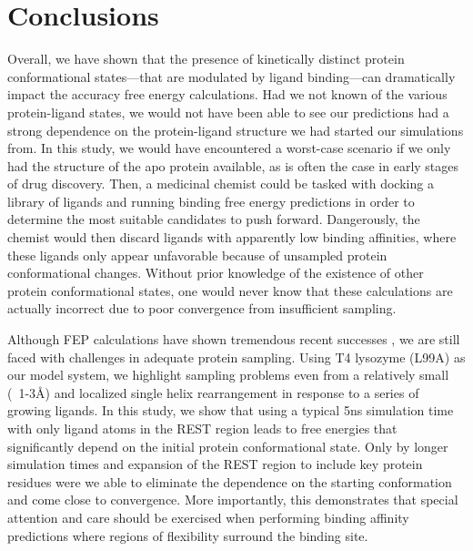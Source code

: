 \documentclass[journal=jctcce,manuscript=article]{achemso}
\begin{document}
\section{Conclusions}
Overall, we have shown that the presence of kinetically distinct protein conformational states---that are modulated by ligand binding---can dramatically impact the accuracy free energy calculations.
Had we not known of the various protein-ligand states, we would not have been able to see our predictions had a strong dependence on the protein-ligand structure we had started our simulations from.
In this study, we would have encountered a worst-case scenario if we only had the structure of the apo protein available, as is often the case in early stages of drug discovery.
Then, a medicinal chemist could be tasked with docking a library of ligands and running binding free energy predictions in order to determine the most suitable candidates to push forward.
Dangerously, the chemist would then discard ligands with apparently low binding affinities, where these ligands only appear unfavorable because of unsampled protein conformational changes.
Without prior knowledge of the existence of other protein conformational states, one would never know that these calculations are actually incorrect due to poor convergence from insufficient sampling.

Although FEP calculations have shown tremendous recent successes \cite{FEPplus}, we are still faced with challenges in adequate protein sampling.
Using T4 lysozyme (L99A) as our model system, we highlight sampling problems even from a relatively small (~1-3\AA) and localized single helix rearrangement in response to a series of growing ligands.
In this study, we show that using a typical 5ns simulation time with only ligand atoms in the REST region leads to free energies that significantly depend on the initial protein conformational state. 
Only by longer simulation times and expansion of the REST region to include key protein residues were we able to eliminate the dependence on the starting conformation and come close to convergence.
More importantly, this demonstrates that special attention and care should be exercised when performing binding affinity predictions where regions of flexibility surround the binding site.
\end{document}
